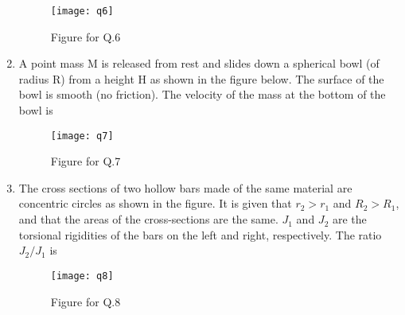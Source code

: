 \documentclass[journal,11pt,onecolumn]{IEEEtran}
\begin{document}
\begin{enumerate}
          \begin{figure}[H]
              \centering
              \texttt{[image: q6]}
              \caption{Figure for Q.6}
              \label{q6}
          \end{figure}

    \item A point mass M is released from rest and slides down a spherical bowl (of radius R) from a height H as shown in the figure below. The surface of the bowl is smooth (no friction). The velocity of the mass at the bottom of the bowl is

          \begin{figure}[H]
              \centering
              \texttt{[image: q7]}
              \caption{Figure for Q.7}
              \label{q7}
          \end{figure}

          \begin{enumerate}


          \end{enumerate}

    \item The cross sections of two hollow bars made of the same material are concentric circles as shown in the figure. It is given that $r_2 > r_1$ and $R_2 > R_1$, and that the areas of the cross-sections are the same. $J_1$ and $J_2$ are the torsional rigidities of the bars on the left and right, respectively. The ratio $J_2/J_1$ is

          \begin{figure}[H]
              \centering
              \texttt{[image: q8]}
              \caption{Figure for Q.8}
              \label{q8}
          \end{figure}

          \begin{enumerate}


\end{enumerate}
\end{enumerate}
\end{document}

